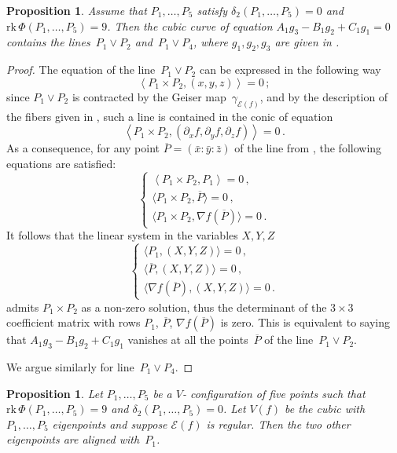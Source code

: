 \documentclass[a4paper, 11pt, reqno]{amsart}
\theoremstyle{plain}
\newtheorem{prop}[lemma]{Proposition}
\theoremstyle{definition}
\newcommand{\de}{\partial}
\newcommand{\rk}{\ensuremath{\mathrm{rk}}}
\newcommand{\Eig}[1]{\mathcal{E}\!\left( {#1} \right)}
\begin{document}
\begin{prop}
\label{proposition:G_split}
Assume that $P_1, \dots, P_5 $ satisfy $\delta_2(P_1, \dotsc, P_5) = 0$ and $\rk \, \Phi(P_1, \dotsc, P_5) = 9$. Then the cubic curve
of equation $A_1 g_3 - B_1 g_2 + C_1 g_1=0$ contains the lines~$P_1 \vee P_2$ and~$P_1 \vee P_4$, where $g_1, g_2, g_3$ are given in .
\end{prop}
\begin{proof}
The equation of the line~$P_1 \vee P_2$ can be expressed in the following way
%
\begin{equation}
\label{eq:lineP1P2}
  \left\langle P_1 \times P_2, (x,y,z) \right\rangle = 0 \,;
\end{equation}
%
since $P_1 \vee P_2$ is contracted by the Geiser map~$\gamma_{\Eig{f}}$,
and by the description of the fibers given in , such a line is contained in the conic of equation
%
\[
  \left\langle P_1 \times P_2, (\de_x f, \de_y f, \de_z f) \right\rangle = 0 \,.
\]
%
As a consequence, for any point $\overline{P} = (\bar x: \bar y: \bar z)$ of the line from , the following equations are satisfied:
%
\[
  \left\{
  \begin{array}{l}
    \left\langle P_1 \times P_2, P_1 \right\rangle = 0 \,,\\[2pt]
    \bigl\langle P_1 \times P_2, \overline{P} \bigr\rangle = 0 \,,\\[2pt]
    \bigl\langle P_1 \times P_2, \nabla f (\overline{P}) \bigr\rangle = 0 \,.
  \end{array}
  \right.
\]
%
It follows that the linear system in the variables $X,Y,Z$
%
\[
  \left\{
  \begin{array}{l}
    \bigl\langle P_1, (X,Y,Z) \bigr\rangle = 0 \,,\\[2pt]
    \bigl\langle \overline{P}, (X,Y,Z) \bigr\rangle = 0 \,,\\[2pt]
    \bigl\langle \nabla f (\overline{P}),
    (X,Y,Z) \bigr\rangle = 0 \,.
  \end{array}
  \right.
\]
%
admits $P_1 \times P_2$ as a non-zero solution,
thus the determinant of the $3 \times 3$ coefficient matrix with rows
 $P_1$, $\overline{P}$, $\nabla f (\overline{P})$ is zero. This is equivalent to saying that $A_1 g_3 - B_1 g_2 + C_1 g_1$ vanishes at all the points~$\overline{P}$ of the line~$P_1 \vee P_2$.

We argue similarly for line~$P_1 \vee P_4$.
\end{proof}
%
\begin{prop}
\label{proposition:third_alignment}
Let $P_1, \dots, P_5$ be a $V$- configuration of five points such that
$\rk\, \Phi(P_1, \dots, P_5) = 9$ and
$\delta_2(P_1, \dots, P_5) = 0$. Let $V(f)$ be
the cubic with $P_1, \dots, P_5$
eigenpoints and suppose $\Eig{f}$ is
regular. Then the two other eigenpoints are aligned with~$P_1$.
\end{prop}
\end{document}
